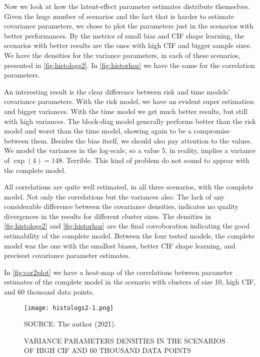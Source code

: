 Now we look at how the latent-effect parameter estimates distribute
themselves. Given the huge number of scenarios and the fact that is
harder to estimate covariance parameters, we chose to plot the
parameters just in the scenarios with better performances. By the
metrics of small bias and CIF shape learning, the scenarios with better
results are the ones with high CIF and bigger sample sizes. We have the
densities for the variance parameters, in each of these scenarios,
presented in \autoref{fig:histologs2}. In \autoref{fig:historhoz} we
have the same for the correlation parameters.

An interesting result is the clear difference between risk and time
models' covariance parameters. With the risk model, we have an evident
super estimation and bigger variances. With the time model we get much
better results, but still with high variances. The block-diag model
generally performs better than the risk model and worst than the time
model, showing again to be a compromise between them. Besides the bias
itself, we should also pay attention to the values. We model the
variances in the log-scale, so a value 5, in reality, implies a variance
of \(\exp(4) = 148\). Terrible. This kind of problem do not sound to
appear with the complete model.

All correlations are quite well estimated, in all three scenarios, with
the complete model. Not only the correlations but the variances
also. The lack of any considerable difference between the covariance
densities, indicates no quality divergences in the results for different
cluster sizes. The densities in \autoref{fig:histologs2} and
\autoref{fig:historhoz} are the final corroboration indicating the good
estimability of the complete model. Between the four tested models, the
complete model was the one with the smallest biases, better CIF shape
learning, and precisest covariance parameter estimates.

In \autoref{fig:cor2plot} we have a heat-map of the correlations between
parameter estimates of the complete model in the scenario with clusters
of size 10, high CIF, and 60 thousand data points.

\begin{figure}[!htpb]
 \setlength{\abovecaptionskip}{.0001pt}
 \caption{VARIANCE PARAMETERS DENSITIES IN THE SCENARIOS OF HIGH CIF AND
          60 THOUSAND DATA POINTS}
 \vspace{0.2cm}\centering
 \texttt{[image: histologs2-1.png]}\\
 \begin{footnotesize}
  SOURCE: The author (2021).
 \end{footnotesize}
 \label{fig:histologs2}
\end{figure}

